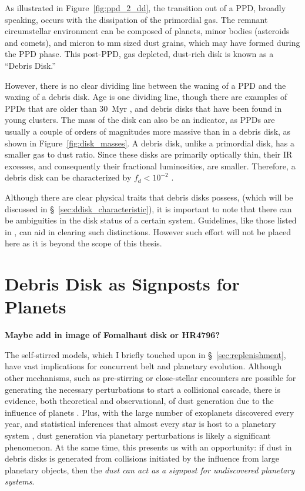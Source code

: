     As illustrated in Figure~\ref{fig:ppd_2_dd}, the transition out of a PPD, broadly speaking, occurs with the dissipation of the primordial gas. The remnant circumstellar environment can be composed of planets, minor bodies (asteroids and comets), and micron to mm sized dust grains, which may have formed during the PPD phase. This post-PPD, gas depleted, dust-rich disk is known as a ``Debris Disk.'' %
    
    However, there is no clear dividing line between the waning of a PPD and the waxing of a debris disk. Age is one dividing line, though there are examples of PPDs that are older than 30~Myr \citep{DeMarchi2013,Scicluna2014}, and debris disks that have been found in young clusters. The mass of the disk can also be an indicator, as PPDs are usually a couple of orders of magnitudes more massive than in a debris disk, as shown in Figure~\ref{fig:disk_masses}. A debris disk, unlike a primordial disk, has a smaller gas to dust ratio. Since these disks are primarily optically thin, their IR excesses, and consequently their fractional luminosities, are smaller. Therefore, a debris disk can be characterized by $f_d<10^{-2}$ \citep{Zuckerman2001, Wyatt2008}. 
    
    Although there are clear physical traits that debris disks possess, (which will be discussed in  \S~\ref{sec:ddisk_characteristic}), it is important to note that there can be ambiguities in the disk status of a certain system. Guidelines, like those listed in \citet{Wyatt2015}, can aid in clearing such distinctions. However such effort will not be placed here as it is beyond the scope of this thesis.
    
    
\section{Debris Disk as Signposts for Planets} \label{sec:disks_signposts_planets}
    \textbf{Maybe add in image of Fomalhaut disk or HR4796?}
    
    The self-stirred models, which I briefly touched upon in \S~\ref{sec:replenishment}, have vast implications for concurrent belt and planetary evolution. Although other mechanisms, such as pre-stirring or close-stellar encounters are possible for generating the necessary perturbations to start a collisional cascade, there is evidence, both theoretical and observational, of dust generation due to the influence of planets \citep[e.g., the HD~141569 system,][]{Wyatt2005}. Plus, with the large number of exoplanets discovered every year, and statistical inferences that almost every star is host to a planetary system \citep{Cassan2012}, dust generation via planetary perturbations is likely a significant phenomenon. At the same time, this presents us with an opportunity: if dust in debris disks is generated from collisions initiated by the influence from large planetary objects, then the \textit{dust can act as a signpost for undiscovered planetary systems}.
    

